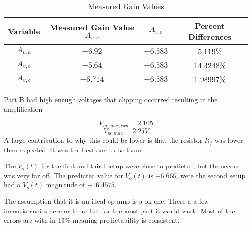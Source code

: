 \documentclass{article}
\begin{document}
\begin{table}[h]
\begin{center}
\label{code:resis}
\caption{Measured Gain Values}
\begin{tabular}{c|c|c|c}
Variable & Measured Gain Value $A_{v,x}$ & $A_{v,e}$ & Percent Differences 
\\\hline
$A_{v,a}$ & $-6.92$ & $-6.583$ & 5.119\%  \\
$A_{v,b}$ & $-5.64$ & $-6.583$ & 14.3248\%  \\
$A_{v,c}$ & $-6.714$ & $-6.583$ & 1.98997\%  \\

\end{tabular}
\end{center}

\end{table}

Part B had high enough voltages that clipping occurred resulting in the amplification 


$$V_{m,max,exp} = 2.105$$
$$V_{m,max}= 2.25V$$
A large contribution to why this could be lower is that the resistor $R_f$ was lower than expected. It was the best one to be found.


The $V_o(t)$ for the first and third setup were close to predicted, but the second was very far off. The predicted value for $V_o(t)$ is $-6.666$, were the second setup had a $V_o(t)$ magnitude of $-16.4575$. 

The assumption that it is an ideal op-amp is a ok one. There a a few inconsistencies here or there but for the most part it would work. Most of the errors are with in 10\% meaning predictability is consistent.
\end{document}
